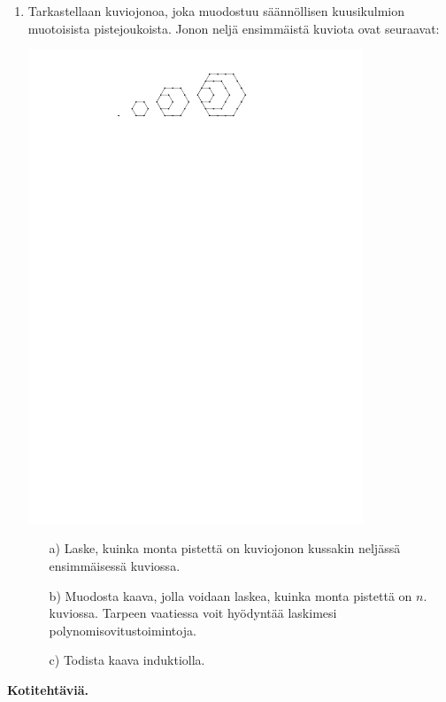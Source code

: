 \begin{enumerate}
\item Tarkastellaan kuviojonoa, joka muodostuu säännöllisen kuusikulmion muotoisista pistejoukoista. Jonon neljä ensimmäistä kuviota ovat seuraavat:

\begin{center}
\includegraphics[width=10cm]{kuvat/Kappale5_4_kuusikulm_v2}
\end{center}


\begin{itemize}
\item[a)] Laske, kuinka monta pistettä on kuviojonon kussakin neljässä ensimmäisessä kuviossa.
\item[b)] Muodosta kaava, jolla voidaan laskea, kuinka monta pistettä on $n$. kuviossa. Tarpeen vaatiessa voit hyödyntää laskimesi polynomisovitustoimintoja.
\item[c)] Todista kaava induktiolla.
\end{itemize}

\end{enumerate}

{\bf Kotitehtäviä.}

